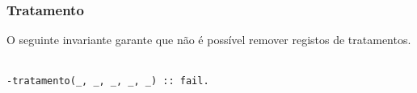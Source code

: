 \subsubsection*{Tratamento}
O seguinte invariante garante que não é possível remover registos de tratamentos.
\
\begin{lstlisting}[caption={Invariante de remoção relativo ao predicado \texttt{tratamento}}]
% Nao permite a remocao de registos de tratamentos
-tratamento(_, _, _, _, _) :: fail.
\end{lstlisting}
